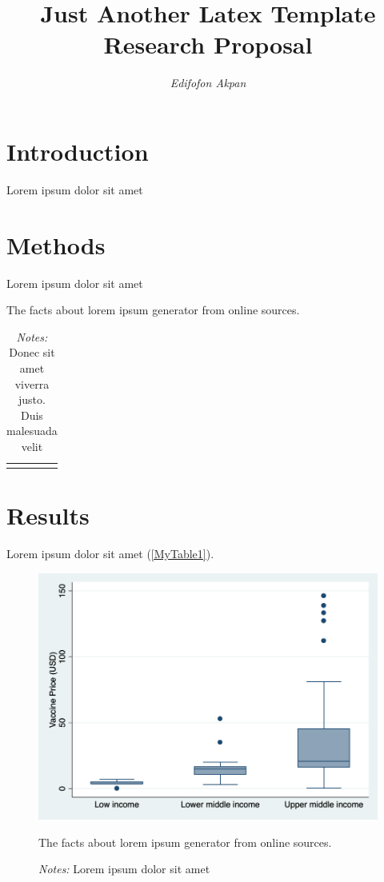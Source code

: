 \documentclass[12pt]{article}
\title{\LARGE \bfseries \vspace{-1cm} Just Another Latex Template \\
    \LARGE \normalfont Research Proposal}
\author{\Large \textit{Edifofon Akpan}}
\date{ }
\begin{document}
\fontsize{13pt}{15pt}\selectfont

\maketitle


\section{Introduction}
Lorem ipsum dolor sit amet

\section{Methods}
Lorem ipsum dolor sit amet 

\hspace{1em}

\begin{table}[H]
    \centering 
    \caption{The facts about lorem ipsum generator from online sources.}
    \begin{tabular}{|C{2cm}|L{10cm}|C{2.5cm}|}
        \hline
    \end{tabular}
    \label{MyTable1}
    \caption*{\footnotesize \textit{Notes:} Donec sit amet viverra justo. Duis malesuada velit}
\end{table}


\section{Results}
Lorem ipsum dolor sit amet (\autoref{MyTable1}). 

\hspace{1em}

\begin{figure}[H]
    \centering
    \includegraphics[width=1\linewidth]{output/figures/dose-price-income.png}
    \caption{The facts about lorem ipsum generator from online sources.}
    \label{fig:enter-label}
    \caption*{\footnotesize \textit{Notes:} Lorem ipsum dolor sit amet}
\end{figure}
\end{document}
